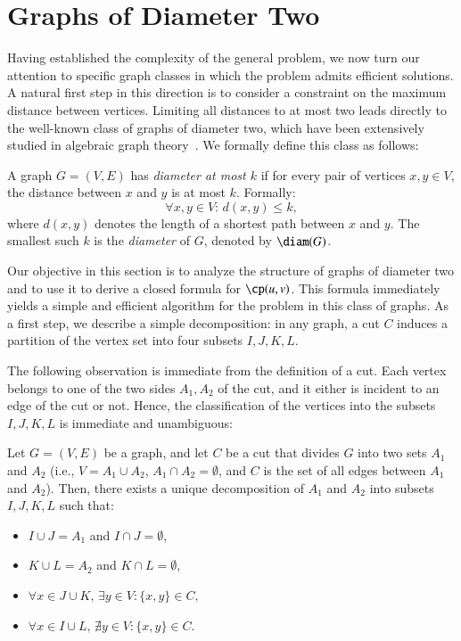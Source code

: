 \section{Graphs of Diameter Two}
\label{sec:diameter-two}



Having established the complexity of the general \MinCutPath{} problem, we now turn our attention to specific graph classes in which the problem admits efficient solutions.
A natural first step in this direction is to consider a constraint on the maximum distance between vertices.
Limiting all distances to at most two leads directly to the well-known class of graphs of diameter two, which have been extensively studied in algebraic graph theory~\cite{GodsilRoyle2001}.
We formally define this class as follows:

\begin{definition}[Diameter]
\label{def:diameter}
A graph $G = (V, E)$ has \emph{diameter at most $k$} if for every pair of vertices $x, y \in V$, the distance between $x$ and $y$ is at most $k$. Formally:
\[
\forall x, y \in V: \, d(x, y) \leq k,
\]
where $d(x, y)$ denotes the length of a shortest path between $x$ and $y$.
The smallest such $k$ is the \emph{diameter} of $G$, denoted by $\diam(G)$.
\end{definition}

Our objective in this section is to analyze the structure of graphs of diameter two and to use it to derive a closed formula for $\cp(u,v)$.
This formula immediately yields a simple and efficient algorithm for the \MinCutPath{} problem in this class of graphs.
As a first step, we describe a simple decomposition:
in any graph, a cut $C$ induces a partition of the vertex set into four subsets $I, J, K, L$.



The following observation is immediate from the definition of a cut.
Each vertex belongs to one of the two sides $A_1, A_2$ of the cut, and it either is incident to an edge of the cut or not.
Hence, the classification of the vertices into the subsets $I, J, K, L$ is immediate and unambiguous:

\begin{lemma}
\label{lem:cut-decomposition}
Let $G = (V, E)$ be a graph, and let $C$ be a cut that divides $G$ into two sets $A_1$ and $A_2$ (i.e., $V = A_1 \cup A_2$, $A_1 \cap A_2 = \emptyset$, and $C$ is the set of all edges between $A_1$ and $A_2$).
Then, there exists a unique decomposition of $A_1$ and $A_2$ into subsets $I, J, K, L$ such that:
\begin{itemize}
    \item $I \cup J = A_1$ and $I \cap J = \emptyset$,
    \item $K \cup L = A_2$ and $K \cap L = \emptyset$,
    \item $\forall x \in J \cup K, \, \exists y \in V: \{x, y\} \in C,$
    \item $\forall x \in I \cup L, \, \nexists y \in V: \{x, y\} \in C.$
\end{itemize}
\end{lemma}


